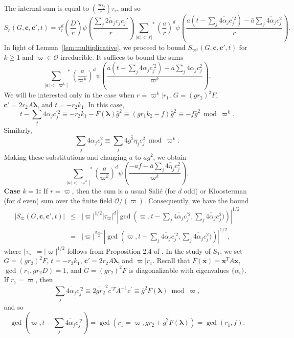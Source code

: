 \documentclass[11pt]{amsart}
\theoremstyle{plain}
\theoremstyle{plain}
\renewcommand{\vec}[1]{\mathbf{#1}}
\theoremstyle{remark}
\theoremstyle{definition}
\begin{document}
The internal sum is equal to $\left(\frac{a\alpha_j}{r}\right)\tau_r$, and so
\[S_r(G,\vec{c},\vec{c}',t)=\tau_r^d\left(\frac{D}{r}\right)\psi\left(\frac{\sum_{j}\overline{2\alpha_j}c_jc_j'}{r}\right){\sum_{|a|<|r|}}^* \left(\frac{a}{r} \right)^d \psi\left(\frac{a(t-\sum_{j}\overline{4\alpha_j}c_j^{\prime 2})-\bar{a}\sum_{j}\overline{4\alpha_j}c_j^2}{r}  \right).\]
In light of Lemma~\ref{lem:multiplicative}, we proceed to bound $S_{\varpi^k}(G,\vec{c},\vec{c}',t)$ for $k\geq 1$ and $\varpi\in\mathcal{O}$ irreducible. It suffices to bound the sums
\[{\sum_{|a|<|\varpi^k|}}^* \left(\frac{a}{\varpi^k} \right)^d \psi\left(\frac{a(t-\sum_{j}\overline{4\alpha_j}c_j^{\prime 2})-\bar{a}\sum_{j}\overline{4\alpha_j}c_j^2}{\varpi^k}  \right).\]
We will be interested only in the case when $r=\varpi^k|r_1$, $G=(gr_2)^2F$, $\vec{c}'=2r_2A\boldsymbol{\lambda}$, and $t=-r_2k_1$. In this case,
\[t-\sum_{j}\overline{4\alpha_j}c_j^{\prime 2}\equiv -r_2k_1-F(\boldsymbol{\lambda})\bar{g}^2\equiv (gr_1k_2-f)\bar{g}^2\equiv -f\bar{g}^2\bmod \varpi^k.\]
Similarly,
\[\sum_{j}\overline{4\alpha_j}c_j^2\equiv\sum_{j}\overline{4g^2\eta_j}c_j^2\bmod\varpi^k.\]
Making these substitutions and changing $a$ to $ag^2$, we obtain
\[{\sum_{|a|<|\varpi^k|}}^* \left(\frac{a}{\varpi^k} \right)^d \psi\left(\frac{-af-\bar{a}\sum_{j}\overline{4\eta_j}c_j^2}{\varpi^k}  \right).\]
\textbf{Case $k=1$: }If $r=\varpi$, then the sum is a usual Sali\'e (for $d$ odd) or Kloosterman (for $d$ even) sum over the finite field $\mathcal{O}/(\varpi)$. Consequently, we have the bound
\begin{eqnarray*}|S_{\varpi}(G,\vec{c},\vec{c}',t)|&\leq& |\varpi|^{1/2}|\tau_{\varpi}|^d\left|\gcd\left(\varpi,t-\sum_{j}\overline{4\alpha_j}c_j^{\prime 2},\sum_{j}\overline{4\alpha_j}c_j^2)\right)\right|^{1/2}\\&=&|\varpi|^{\frac{d+1}{2}}\left|\gcd\left(\varpi,t-\sum_{j}\overline{4\alpha_j}c_j^{' 2},\sum_{j}\overline{4\alpha_j}c_j^2)\right)\right|^{1/2},
\end{eqnarray*}
where $|\tau_{\varpi}|=|\varpi|^{1/2}$ follows from Proposition 2.4 of \cite{Kowalski:expsums}. In the study of $S_1$, we set $G=(gr_2)^2F$, $t=-r_2k_1$, $\vec{c}'=2r_2A\boldsymbol{\lambda}$, and $\varpi|r_1$. Recall that $F(\vec{x})=\vec{x}^{T}A\vec{x}$,  $\gcd(r_1,gr_2D)=1$, and $G=(gr_2)^2F$ is diagonalizable with eigenvalues $\{\alpha_i \}$. If $r_1=\varpi$, then
 \[\sum_{j}\overline{4\alpha_j}c_j^{\prime 2} \equiv  \overline{2gr_2}^2 c^{\prime T} A^{-1} c^{\prime} \equiv\overline{g}^2F(\boldsymbol{\lambda})\bmod \varpi,\]
and so
\[\gcd\left(\varpi,t-\sum_{j}\overline{4\alpha_j}c_j^{'2}\right)=\gcd\left(r_1=\varpi,gr_2+\overline{g}^2F(\boldsymbol{\lambda})\right)=\gcd(r_1,f).\]
\end{document}
